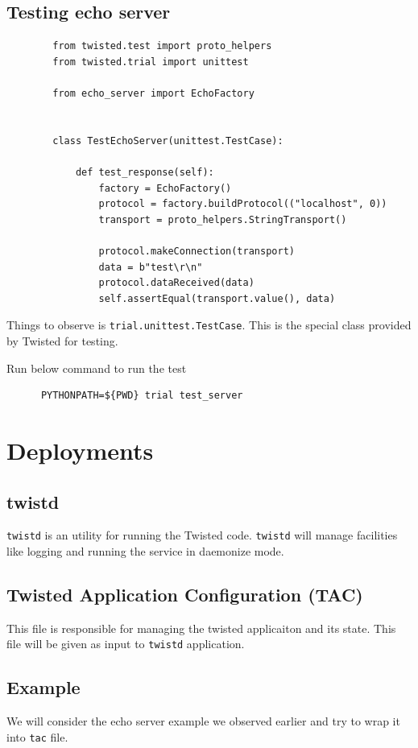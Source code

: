 \documentclass{article}
\begin{document}
    \subsection{Testing echo server}
      \begin{verbatim}
        from twisted.test import proto_helpers
        from twisted.trial import unittest

        from echo_server import EchoFactory


        class TestEchoServer(unittest.TestCase):

            def test_response(self):
                factory = EchoFactory()
                protocol = factory.buildProtocol(("localhost", 0))
                transport = proto_helpers.StringTransport()

                protocol.makeConnection(transport)
                data = b"test\r\n"
                protocol.dataReceived(data)
                self.assertEqual(transport.value(), data)
    \end{verbatim}

    Things to observe is \texttt{trial.unittest.TestCase}. This is the special
    class provided by Twisted for testing.

    Run below command to run the test
    \begin{verbatim}
      PYTHONPATH=${PWD} trial test_server
    \end{verbatim}

  \section{Deployments}

    \subsection{twistd}
      \texttt{twistd} is an utility for running the Twisted code.
      \texttt{twistd} will manage facilities like logging and running the
      service in daemonize mode.

    \subsection{Twisted Application Configuration (TAC)}
      This file is responsible for managing the twisted applicaiton and its
      state. This file will be given as input to \texttt{twistd} application.

    \subsection{Example}
      We will consider the echo server example we observed earlier and try to
      wrap it into \texttt{tac} file.
\end{document}

